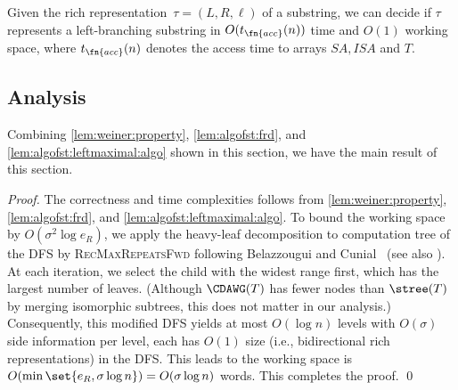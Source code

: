 
\begin{lemma}
\label{lem:algofst:leftmaximal:algo}  
Given  the rich representation~$\tau = (L, R, \ell)$ of a substring, we can decide if
  $\tau$ represents a left-branching substring in $O(t_\fn{acc}(n))$ time and $O(1)$ working space, where $t_\fn{acc}(n)$ denotes the access time to arrays $SA, ISA$ and $T$. 
\end{lemma}



\subsection{Analysis}
Combining \cref{lem:weiner:property}, \cref{lem:algofst:frd}, and \cref{lem:algofst:leftmaximal:algo} shown in this section, we have the main result of this section. 
  


\begin{proof}
  The correctness and time complexities follows from \cref{lem:weiner:property}, \cref{lem:algofst:frd}, and \cref{lem:algofst:leftmaximal:algo}. To bound the working space by $O(\sigma^2 \log e_R)$, we apply the heavy-leaf decomposition to computation tree of the DFS by  \textsc{RecMaxRepeatsFwd} following Belazzougui and Cunial~\cite[Lemma~4.2]{belazzougui2020linear} (see also \cite{hoare1962computj:quicksort}). 
  At each iteration, we select the child with the widest range first, which has the largest number of leaves.
  (Although $\CDAWG(T)$ has fewer  nodes than $\stree(T)$ by merging isomorphic subtrees, this does not matter in our analysis.) Consequently, this modified DFS yields at most $O(\log n)$ levels with $O(\sigma)$ side information per level, each has $O(1)$ size (i.e., bidirectional rich representations) in the DFS. This leads to the working space is $O(\min\set{e_R, \sigma\log n}) = O(\sigma\log n)$ words. This completes the proof. \qed 
\end{proof}



